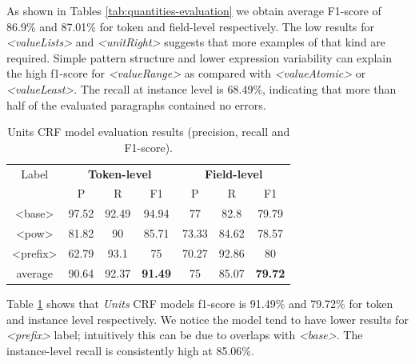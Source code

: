 \documentclass[sigconf]{acmart}
\begin{document}
As shown in Tables \ref{tab:quantities-evaluation} we obtain average F1-score of 86.9\% and 87.01\% for token and field-level respectively. The low results for \textit{<valueLists>} and \textit{<unitRight>} suggests that more examples of that kind are required. Simple pattern structure and lower expression variability can explain the high f1-score for \textit{<valueRange>} as compared with \textit{<valueAtomic>} or \textit{<valueLeast>}. The recall at instance level is 68.49\%, indicating that more than half of the evaluated paragraphs contained no errors. 

\begin{table}[ht]
    \caption{Units CRF model evaluation results (precision, recall and F1-score).}
    \label{tab:units-evaluation}
    \begin{tabular}{c|ccc|ccc}
        \toprule
        Label & \multicolumn{3}{c}{\textbf{Token-level}} & \multicolumn{3}{c}{\textbf{Field-level}}\\
        & P & R & F1 & P & R & F1 \\
        \midrule
        <base>    & 97.52 & 92.49 & 94.94 & 77    & 82.8  & 79.79 \\
        <pow>     & 81.82 & 90    & 85.71 & 73.33 & 84.62 & 78.57 \\
        <prefix>  & 62.79 & 93.1  & 75    & 70.27 & 92.86 & 80    \\
        \midrule
        average   & 90.64  & 92.37 & \textbf{91.49} & 75   & 85.07 & \textbf{79.72} \\
        \bottomrule
   \end{tabular}
\end{table}

Table \ref{tab:units-evaluation} shows that \textit{Units} CRF models f1-score is 91.49\% and 79.72\% for token and instance level respectively. We notice the model tend to have lower results for \textit{<prefix>} label; intuitively this can be due to overlaps with \textit{<base>}. The instance-level recall is consistently high at 85.06\%. 
\end{document}
